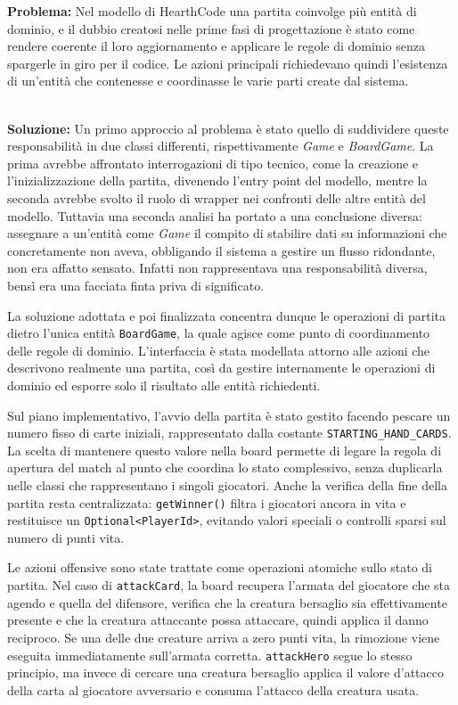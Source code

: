 \textbf{Problema:} Nel modello di HearthCode una partita coinvolge più
entità di dominio, e il dubbio creatosi nelle prime fasi di progettazione è stato come
rendere coerente il loro aggiornamento e applicare le regole di dominio senza
spargerle in giro per il codice. Le azioni principali richiedevano quindi l'esistenza
di un'entità che contenesse e coordinasse le varie parti create dal sistema.

\textbf{\\Soluzione:} Un primo approccio al problema è stato quello di suddividere queste
responsabilità in due classi differenti, rispettivamente \textit{Game} e \textit{BoardGame}.
La prima avrebbe affrontato interrogazioni di tipo tecnico, come la creazione e l'inizializzazione
della partita, divenendo l'entry point del modello, mentre la seconda avrebbe svolto il ruolo
di wrapper nei confronti delle altre entità del modello. Tuttavia una seconda analisi ha
portato a una conclusione diversa: assegnare a un'entità come \textit{Game} il compito
di stabilire dati su informazioni che concretamente non aveva, obbligando il sistema
a gestire un flusso ridondante, non era affatto sensato. Infatti non rappresentava una responsabilità
diversa, bensì era una facciata finta priva di significato.

La soluzione adottata e poi finalizzata concentra dunque le operazioni di partita
dietro l'unica entità \texttt{BoardGame}, la quale agisce come punto di coordinamento delle
regole di dominio. L'interfaccia è stata modellata attorno alle azioni
che descrivono realmente una partita, così da gestire internamente le operazioni di dominio
ed esporre solo il risultato alle entità richiedenti.

Sul piano implementativo, l'avvio della partita è stato gestito facendo pescare
un numero fisso di carte iniziali, rappresentato dalla costante
\texttt{STARTING\_HAND\_CARDS}. La scelta di mantenere questo valore nella board
permette di legare la regola di apertura del match al punto che coordina lo
stato complessivo, senza duplicarla nelle classi che rappresentano i singoli
giocatori. Anche la verifica della fine della partita resta centralizzata:
\texttt{getWinner()} filtra i giocatori ancora in vita e restituisce un
\texttt{Optional<PlayerId>}, evitando valori speciali o controlli sparsi sul
numero di punti vita.

Le azioni offensive sono state trattate come operazioni atomiche sullo stato di
partita. Nel caso di \texttt{attackCard}, la board recupera l'armata del
giocatore che sta agendo e quella del difensore, verifica che la creatura
bersaglio sia effettivamente presente e che la creatura attaccante possa
attaccare, quindi applica il danno reciproco. Se una delle due creature arriva
a zero punti vita, la rimozione viene eseguita immediatamente sull'armata
corretta. \texttt{attackHero} segue lo stesso principio, ma invece di cercare una
creatura bersaglio applica il valore d'attacco della carta al giocatore
avversario e consuma l'attacco della creatura usata.

